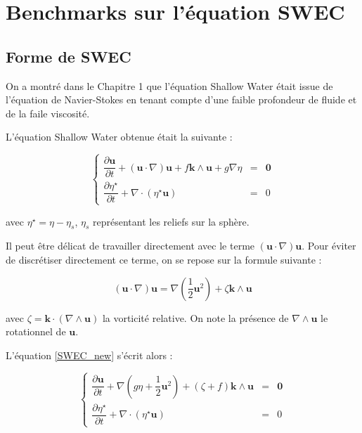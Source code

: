 \chapter{Benchmarks sur l'équation SWEC}

\section{Forme de SWEC}

On a montré dans le Chapitre 1 que l'équation Shallow Water était issue de l'équation de Navier-Stokes en tenant compte d'une faible profondeur de fluide et de la faile viscosité.

L'équation Shallow Water obtenue était la suivante :

\begin{equation}
\label{SWEC_new}
\left\lbrace
\begin{array}{rcl}
\dfrac{\partial \mathbf{u}}{\partial t} + \left( \mathbf{u} \cdot \nabla \right) \mathbf{u} + f \mathbf{k} \wedge \mathbf{u} + g \nabla \eta & = & \mathbf{0} \\
\dfrac{\partial \eta^{\star}}{\partial t} + \nabla \cdot \left( \eta^{\star} \mathbf{u} \right) & = & 0
\end{array}
\right.
\end{equation}

avec $\eta^{\star} = \eta - \eta_s$, $\eta_s$ représentant les reliefs sur la sphère.

Il peut être délicat de travailler directement avec le terme $\left( \mathbf{u} \cdot \nabla \right) \mathbf{u}$. Pour éviter de discrétiser directement ce terme, on se repose sur la formule suivante :

\begin{equation}
\left( \mathbf{u} \cdot \nabla \right) \mathbf{u} = \nabla \left( \dfrac{1}{2} \mathbf{u}^2 \right) + \zeta \mathbf{k} \wedge \mathbf{u}
\end{equation}

avec $\zeta = \mathbf{k} \cdot \left( \nabla \wedge \mathbf{u} \right)$ la vorticité relative. On note la présence de $\nabla \wedge \mathbf{u}$ le rotationnel de $\mathbf{u}$.

L'équation \eqref{SWEC_new} s'écrit alors :

\begin{equation}
\label{SWEC_vectform}
\left\lbrace
\begin{array}{rcl}
\dfrac{\partial \mathbf{u}}{\partial t} + \nabla \left( g \eta + \dfrac{1}{2} \mathbf{u}^2  \right) + \left( \zeta + f \right) \mathbf{k} \wedge \mathbf{u} & = & \mathbf{0} \\
\dfrac{\partial \eta^{\star}}{\partial t} + \nabla \cdot \left( \eta^{\star} \mathbf{u} \right) & = & 0
\end{array}
\right.
\end{equation}

